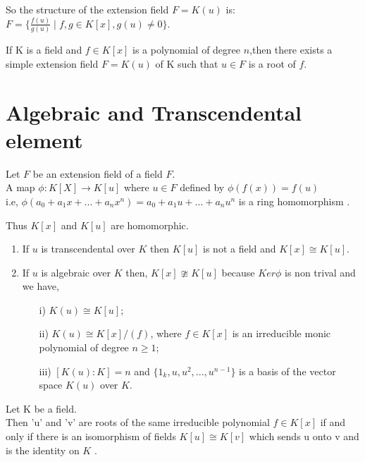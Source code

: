 So the structure of the extension field \(F=K(u)\) is:\\
\(F= \{\frac{f(u)}{g(u)} \;| \; f,g \in K[x],g(u) \neq 0\}\).\\

\begin{theorem}
If K is a field and \(f \in K[x]\) is a polynomial of degree \(n\),then there exists a simple extension field \(F=K(u)\) of K such that \(u\in F\) is a root of \(f\)\cite{hunger}.
\end{theorem}

\section{Algebraic and Transcendental element}
\begin{theorem}
Let \(F\) be an extension field of a field \(F\).\\
A map \(\phi:K[X] \rightarrow K[u]\) where \(u \in F\) defined by \(\phi (f(x))=f(u)\)\\
i.e, \(\phi (a_0+a_1x+...+a_nx^n)= a_0+a_1u+...+a_nu^n\) is a ring homomorphism \cite{hunger}.
\end{theorem}

Thus \( K[x]\) and \(K[u]\) are homomorphic.
  \begin{enumerate}
  \item If \(u\) is transcendental over \(K\) then \(K[u]\) is not a field and \(K[x] \cong K[u]\).
  \item If \(u\) is algebraic over \(K\) then, \(K[x] \ncong K[u]\) because \(Ker\phi\) is non trival and we have,
    \begin{enumerate}
    \item[i)] \(K(u) \cong K[u]\);
    \item[ii)] \(K(u) \cong K[x]/(f)\), where \(f \in K[x]\) is an irreducible monic polynomial of degree \(n \geq 1\);
    \item[iii)] \([K(u):K]=n\) and \(\{1_k,u,u^2,...,u^{n-1}\}\) is a basis of the vector space \(K(u)\) over \(K\).
    \end{enumerate}
  \end{enumerate}

\begin{theorem}
 Let K be a field.\\
 Then 'u' and 'v' are  roots of the same irreducible polynomial \(f \in K[x]\) if and only if there is an isomorphism of fields \(K[u] \cong K[v]\) which sends u onto v and is the identity on \(K\) \cite{hunger}.
\end{theorem}



